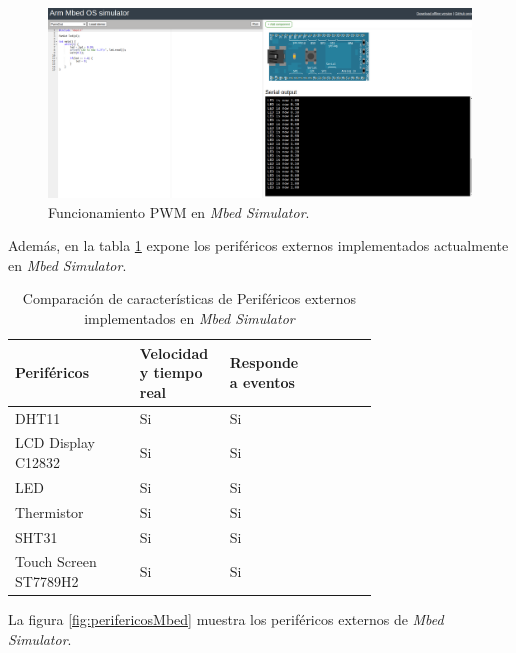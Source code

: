 \begin{figure}[ht]
	\centering
	\includegraphics[scale=.28]{./Figures/PMWMbed.png}
	\caption{Funcionamiento PWM en \textit{Mbed Simulator}.}
	\label{fig:PMWMbed}
\end{figure}





Además, en la tabla \ref{tab:perifericosExternosMBED} expone los  periféricos externos implementados actualmente en \textit{Mbed Simulator}.


\begin{table}[h]
\centering
\caption[Comparación de características de Periféricos externos implementados en \textit{Mbed Simulator}]{Comparación de características de Periféricos externos implementados en \textit{Mbed Simulator}}
\begin{tabular}{p{0.30\linewidth} p{0.14\linewidth}  p{0.14\linewidth}  p{0.14\linewidth}}
\toprule
\textbf{Periféricos} 
& \textbf{Velocidad y tiempo real}
& \textbf{Responde a eventos}
\\
\midrule
DHT11 & Si & Si  \\
LCD Display C12832 & Si & Si  \\
LED & Si & Si \\
Thermistor & Si & Si \\
SHT31 & Si & Si \\
Touch Screen ST7789H2 & Si & Si \\
\bottomrule
\hline
\end{tabular}
\label{tab:perifericosExternosMBED}
\end{table}

\hfill \break
\hfill \break
\hfill \break
\hfill \break
\hfill \break
\hfill \break
\hfill \break
\hfill \break
\hfill \break
\hfill \break
\hfill \break
\hfill \break
\hfill \break
La figura \ref{fig:perifericosMbed} muestra los periféricos externos de \textit{Mbed Simulator}.


